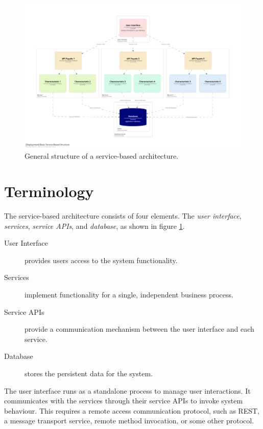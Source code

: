 \begin{figure}[h!]
    \vspace{-5pt}
    \begin{adjustwidth}{-10mm}{-10mm}
        \centering
        \includegraphics[trim=197 197 197 198,clip,width=0.97\paperwidth]{diagrams/general-service-based-arch.png}
    \end{adjustwidth}
    \vspace{-5pt}
    \caption{General structure of a service-based architecture.}
    \label{fig:service-based-arch}
\end{figure}


\section{Terminology}

The service-based architecture consists of four elements.
The \emph{user interface}, \emph{services}, \emph{service APIs}, and \emph{database}, as shown in figure \ref{fig:service-based-arch}.

\begin{description}
    \item[User Interface] provides users access to the system functionality.
    \item[Services] implement functionality for a single, independent business process.
    \item[Service APIs] provide a communication mechanism between the user interface and each service.
    \item[Database] stores the persistent data for the system.
\end{description}

The user interface runs as a standalone process to manage user interactions.
It communicates with the services through their service APIs to invoke system behaviour.
This requires a remote access communication protocol, such as REST, a message transport service,
remote method invocation,  or some other protocol.


